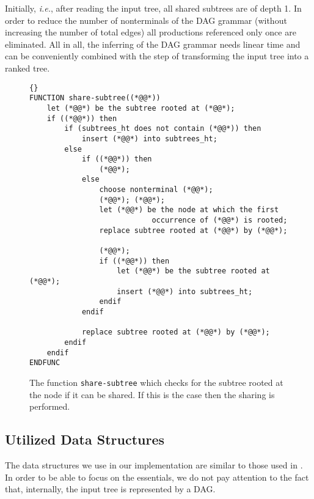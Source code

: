 \documentclass[12pt]{llncs}
\newcommand{\hairsp}{\hspace{1pt}}\newcommand{\TODO}{\textcolor{red}{\bf TODO!}\xspace}
\newcommand{\ie}{\mbox{\textit{i.\hairsp{}e.}}\xspace}
\begin{document}
Initially, \ie, after reading the input tree, all shared subtrees are of depth 1. In order to reduce the number of nonterminals of the DAG grammar (without increasing the number of total edges) all productions referenced only once are eliminated. All in all, the inferring of the DAG grammar needs linear time and can be conveniently combined with the step of transforming the input tree into a ranked tree.
\begin{figure}[tb]
\begin{lstlisting}{}
FUNCTION share-subtree((*@@*))
	let (*@@*) be the subtree rooted at (*@@*);
	if ((*@@*)) then
		if (subtrees_ht does not contain (*@@*)) then
			insert (*@@*) into subtrees_ht;
		else
			if ((*@@*)) then
				(*@@*);
			else
				choose nonterminal (*@@*);
				(*@@*); (*@@*);
				let (*@@*) be the node at which the first 
							occurrence of (*@@*) is rooted;
				replace subtree rooted at (*@@*) by (*@@*);
				
				(*@@*);
				if ((*@@*)) then
					let (*@@*) be the subtree rooted at (*@@*);
					insert (*@@*) into subtrees_ht;
				endif
			endif
			
			replace subtree rooted at (*@@*) by (*@@*);
		endif
	endif
ENDFUNC
\end{lstlisting}
\caption{The function \texttt{share-subtree} which checks for the subtree rooted at the node  if it can be shared. If this is the case then the sharing is performed.}\label{lst:methodShareTree}
\end{figure}

\subsection{Utilized Data Structures}

The data structures we use in our implementation are similar to those used in \cite{larsson2000off}. In order to be able to focus on the essentials, we do not pay attention to the fact that, internally, the input tree is represented by a DAG.
\end{document}
